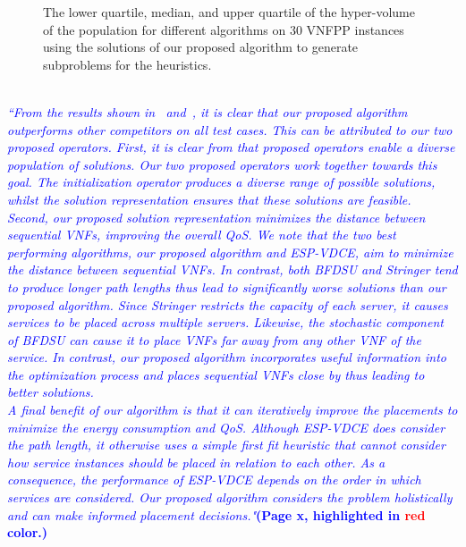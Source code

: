 \begin{enumerate}
\begin{figure}
\begin{minipage}[t]{.48\textwidth}
                        \caption{The lower quartile, median, and upper quartile of the hyper-volume of the population for different algorithms on 30 VNFPP instances using the solutions of our proposed algorithm to generate subproblems for the heuristics.}
                        \label{fig:alg_fixed}
                  \end{minipage}
                  \hfill
            \end{figure}\\
            \textcolor{blue}{\textit{
                        ``From the results shown in~ and~, it is clear that our proposed algorithm outperforms other competitors on all test cases. This can be attributed to our two proposed operators. First, it is clear from  that proposed operators enable a diverse population of solutions. Our two proposed operators work together towards this goal. The initialization operator produces a diverse range of possible solutions, whilst the solution representation ensures that these solutions are feasible.\\
                        Second, our proposed solution representation minimizes the distance between sequential VNFs, improving the overall QoS. We note that the two best performing algorithms, our proposed algorithm and ESP-VDCE, aim to minimize the distance between sequential VNFs. In contrast, both BFDSU and Stringer tend to produce longer path lengths thus lead to significantly worse solutions than our proposed algorithm. Since Stringer restricts the capacity of each server, it causes services to be placed across multiple servers. Likewise, the stochastic component of BFDSU can cause it to place VNFs far away from any other VNF of the service. In contrast, our proposed algorithm incorporates useful information into the optimization process and places sequential VNFs close by thus leading to better solutions.\\
                        A final benefit of our algorithm is that it can iteratively improve the placements to minimize the energy consumption and QoS. Although ESP-VDCE does consider the path length, it otherwise uses a simple first fit heuristic that cannot consider how service instances should be placed in relation to each other. As a consequence, the performance of ESP-VDCE depends on the order in which services are considered. Our proposed algorithm considers the problem holistically and can make informed placement decisions."}\textbf{(Page x, highlighted in \textcolor{red}{red} color.)}}\\


\end{enumerate}
